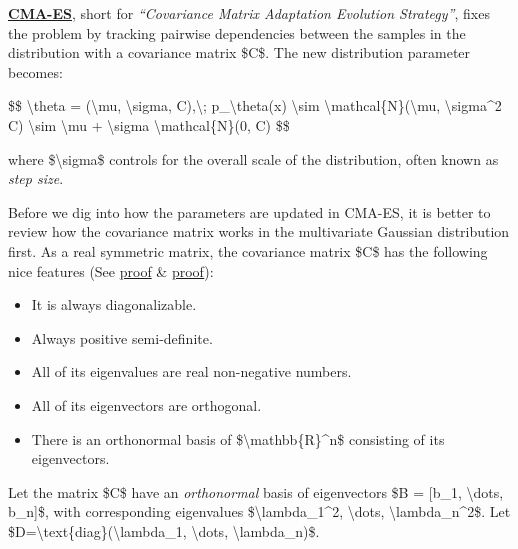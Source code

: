 \href{https://en.wikipedia.org/wiki/CMA-ES}{\textbf{CMA-ES}}, short for \emph{``Covariance Matrix Adaptation Evolution Strategy''}, fixes the problem by tracking pairwise dependencies between the samples in the distribution with a covariance matrix \$C\$. The new distribution parameter becomes:

\$\$ \textbackslash theta = (\textbackslash mu, \textbackslash sigma, C),\textbackslash; p\_\textbackslash theta(x) \textbackslash sim \textbackslash mathcal\{N\}(\textbackslash mu, \textbackslash sigma\^{}2 C) \textbackslash sim \textbackslash mu + \textbackslash sigma \textbackslash mathcal\{N\}(0, C) \$\$

where \$\textbackslash sigma\$ controls for the overall scale of the distribution, often known as \emph{step size}.

Before we dig into how the parameters are updated in CMA-ES, it is better to review how the covariance matrix works in the multivariate Gaussian distribution first. As a real symmetric matrix, the covariance matrix \$C\$ has the following nice features (See \href{http://s3.amazonaws.com/mitsloan-php/wp-faculty/sites/30/2016/12/15032137/Symmetric-Matrices-and-Eigendecomposition.pdf}{proof} \& \href{http://control.ucsd.edu/mauricio/courses/mae280a/lecture11.pdf}{proof}):

\begin{itemize}
\tightlist
\item
  It is always diagonalizable.
\item
  Always positive semi-definite.
\item
  All of its eigenvalues are real non-negative numbers.
\item
  All of its eigenvectors are orthogonal.
\item
  There is an orthonormal basis of \$\textbackslash mathbb\{R\}\^{}n\$ consisting of its eigenvectors.
\end{itemize}

Let the matrix \$C\$ have an \emph{orthonormal} basis of eigenvectors \$B = {[}b\_1, \textbackslash dots, b\_n{]}\$, with corresponding eigenvalues \$\textbackslash lambda\_1\^{}2, \textbackslash dots, \textbackslash lambda\_n\^{}2\$. Let \$D=\textbackslash text\{diag\}(\textbackslash lambda\_1, \textbackslash dots, \textbackslash lambda\_n)\$.

